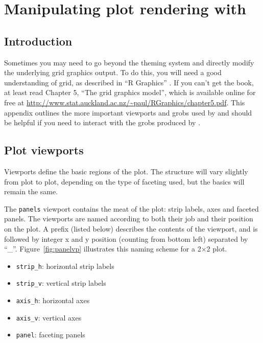 

% 


\chapter{Manipulating plot rendering with }
\label{cha:grid}

\section{Introduction}

Sometimes you may need to go beyond the theming system and directly modify the underlying grid graphics output.  To do this, you will need a good understanding of grid, as described in ``R Graphics'' \citep{murrell:2005}.  If you can't get the book, at least read Chapter 5, ``The grid graphics model'', which is available online for free at  \url{http://www.stat.auckland.ac.nz/~paul/RGraphics/chapter5.pdf}.  This appendix outlines the more important viewports and grobs used by \ggplot and should be helpful if you need to interact with the grobs produced by \ggplot.  

\section{Plot viewports}
\label{sec:plot-viewports}

Viewports define the basic regions of the plot.  The structure will vary slightly from plot to plot, depending on the type of faceting used, but the basics will remain the same.  

The {\tt panels} viewport contains the meat of the plot: strip labels, axes and faceted panels.  The viewports are named according to both their job and their position on the plot.  A prefix (listed below) describes the contents of the viewport, and is followed by integer x and y position (counting from bottom left) separated by ``\_''.  Figure~\ref{fig:panelvp} illustrates this naming scheme for a 2$\times$2 plot.

\begin{itemize}
  \item {\tt strip\_h}: horizontal strip labels
  \item {\tt strip\_v}: vertical strip labels
  \item {\tt axis\_h}: horizontal axes
  \item {\tt axis\_v}: vertical axes
  \item {\tt panel}: faceting panels
\end{itemize}

